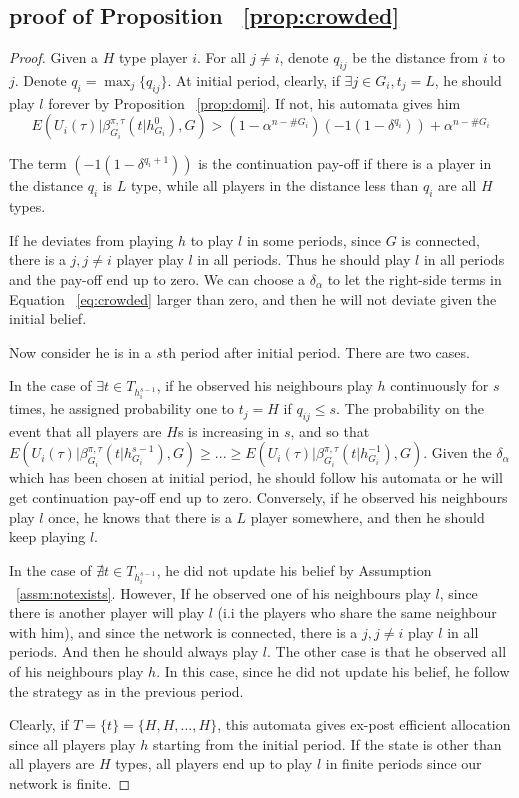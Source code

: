 \documentclass[12pt,letter]{article}
\theoremstyle{remark}
\theoremstyle{remark}
\theoremstyle{claim}
\begin{document}
\subsection{proof of Proposition ~\ref{prop:crowded}}
\begin{proof}

Given a $H$ type player $i$. For all $j\neq i$, denote $q_{ij}$ be the distance from $i$ to $j$. Denote $q_i=\max_{j}\{q_{ij}\}$. At initial period, clearly, if $\exists j\in G_i,t_j=L$, he should play $l$ forever by Proposition ~\ref{prop:domi}. If not, his automata gives him 
\begin{equation}
\label{eq:crowded}
E(U_i(\tau)|\beta^{\pi,\tau}_{G_i}(t|h^0_{G_i}), G)>(1-\alpha^{n-\# G_i})(-1(1-\delta^{q_i}))+\alpha^{n-\# G_i}
\end{equation}

The term $(-1(1-\delta^{q_i+1}))$ is the continuation pay-off if there is a player in the distance $q_i$ is $L$ type, while all players in the distance less than $q_i$ are all $H$ types.

If he deviates from playing $h$ to play $l$ in some periods, since $G$ is connected, there is a $j,j\neq i$ player play $l$ in all periods. Thus he should play $l$ in all periods and the pay-off end up to zero. We can choose a $\delta_{\alpha}$ to let the right-side terms in Equation ~\ref{eq:crowded} larger than zero, and then he will not deviate given the initial belief. 

Now consider he is in a $s$th period after initial period. There are two cases.

In the case of $\exists t\in T_{h^{s-1}_i}$, if he observed his neighbours play $h$ continuously for $s$ times, he assigned probability one to $t_j=H$ if $q_{ij}\leq s$. The probability on the event that all players are $H$s is increasing in $s$, and so that $E(U_i(\tau)|\beta^{\pi,\tau}_{G_i}(t|h^{s-1}_{G_i}), G)\geq...\geq E(U_i(\tau)|\beta^{\pi,\tau}_{G_i}(t|h^{-1}_{G_i}), G)$. Given the $\delta_{\alpha}$ which has been chosen at initial period, he should follow his automata or he will get continuation pay-off end up to zero. Conversely, if he observed his neighbours play $l$ once, he knows that there is a $L$ player somewhere, and then he should keep playing $l$.

In the case of $\nexists t\in T_{h^{s-1}_i}$, he did not update his belief by Assumption ~\ref{assm:notexists}. However, If he observed one of his neighbours play $l$, since there is another player will play $l$ (i.i the players who share the same neighbour with him), and since the network is connected, there is a $j,j\neq i$ play $l$ in all periods. And then he should always play $l$. The other case is that he observed all of his neighbours play $h$. In this case, since he did not update his belief, he follow the strategy as in the previous period. 

Clearly, if $T=\{t\}=\{H,H,...,H\}$, this automata gives ex-post efficient allocation since all players play $h$ starting from the initial period. If the state is other than all players are $H$ types, all players end up to play $l$ in finite periods since our network is finite.

\end{proof}
\end{document}
